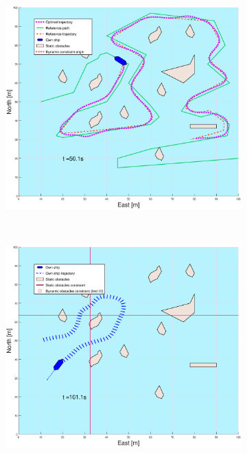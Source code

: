 \begin{figure}[!b]
    \hfill
    \begin{subfigure}[b]{0.499\textwidth}
        \centering
        \includegraphics[width=\textwidth]{Images/Figures/skjergard_u_trafikk/_Simple_1fig999_time=50}
    \end{subfigure}
    \hfill
    \\
    \begin{subfigure}[b]{0.49\textwidth}
        \centering
        \includegraphics[width=\textwidth]{Images/Figures/skjergard_u_trafikk/_Simple_1fig1_time=101}

\end{subfigure}
\end{figure}
